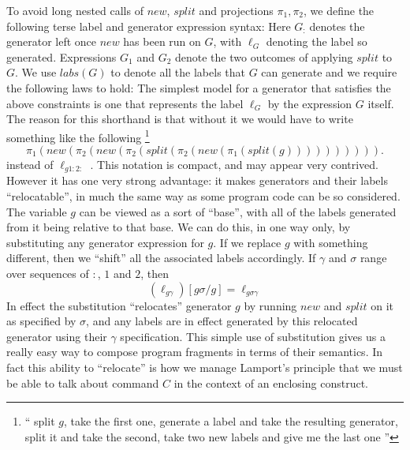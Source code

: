 To avoid long nested calls of $new$, $split$ and projections $\pi_1,\pi_2$,
we define the following terse label and generator expression syntax:
Here $G_{:}$ denotes the generator left once $new$ has been run on $G$,
with $\ell_G$ denoting the label so generated.
Expressions $G_1$ and $G_2$ denote the two outcomes of applying $split$ to $G$.
We use $labs(G)$ to denote all the labels that $G$ can generate
and we require the following laws to hold:
The simplest model for a generator that satisfies the above constraints
is one that represents the label $\ell_G$ by the expression $G$ itself.
The reason for this shorthand is that without it we would have to write
something like the following%
\footnote{``
split $g$, take the first one,
generate a label and take the resulting
generator, split it and take the second,
take two new labels and give me the last one
''}
\begin{equation*}
\pi_1(new(\pi_2(new(\pi_2(split(\pi_2(new(\pi_1(split(g)))))))))).
\end{equation*}
instead of $\ell_{g1:2:}$
.
This notation is compact, and may appear very contrived.
However it has one very strong advantage:
it makes generators and their labels ``relocatable'',
in much the same way as some program code can be so considered.
The variable $g$ can be viewed as a sort of ``base'',
with all of the labels generated from it being relative to that base.
We can do this, in one way only, by substituting any generator expression
for $g$. If we replace $g$ with something different,
then we ``shift'' all the associated labels accordingly.
If $\gamma$ and $\sigma$ range over sequences of $:$, $1$ and $2$, then
\begin{equation}
   (\ell_{g\gamma})[g\sigma/g]  = \ell_{g\sigma\gamma}
\end{equation}
In effect the substitution ``relocates'' generator $g$ by running $new$
and $split$ on it as specified by $\sigma$,
and any labels are in effect generated by this relocated generator using
their $\gamma$ specification.
This simple use of substitution gives us a really easy way to compose
program fragments in terms of their semantics.
In fact this ability to ``relocate'' is how
we manage Lamport's principle that we must be able to talk about command $C$ in the context of an enclosing construct.
